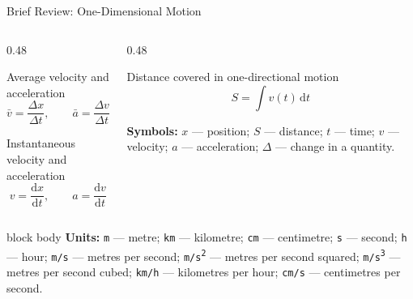 \begin{frame}{Brief Review: One-Dimensional Motion}
  \begin{columns}[T,onlytextwidth]
    \begin{column}{0.48\textwidth}
      \begin{block}{Average velocity and acceleration}
        \[
          \bar v=\frac{\Delta x}{\Delta t},
          \qquad
          \bar a=\frac{\Delta v}{\Delta t}
        \]
      \end{block}
      \begin{block}{Instantaneous velocity and acceleration}
        \[
          v=\frac{\mathrm{d}x}{\mathrm{d}t},
          \qquad
          a=\frac{\mathrm{d}v}{\mathrm{d}t}
        \]
      \end{block}
    \end{column}
    \begin{column}{0.48\textwidth}
      \begin{block}{Distance covered in one-directional motion}
        \[
          S=\int v(t)\,\mathrm{d}t
        \]
      \end{block}
      \footnotesize
      \textbf{Symbols:}
      $x$ — position; $S$ — distance; $t$ — time;
      $v$ — velocity; $a$ — acceleration;
      $\Delta$ — change in a quantity.
    \end{column}
  \end{columns}
  \vspace{0.35em}
  \begin{beamercolorbox}[rounded=true,sep=0.55em,wd=\linewidth]{block body}
    \footnotesize
    \textbf{Units:}
    \texttt{m} — metre; \texttt{km} — kilometre;
    \texttt{cm} — centimetre; \texttt{s} — second; \texttt{h} — hour;
    \texttt{m/s} — metres per second;
    \texttt{m/s\textsuperscript{2}} — metres per second squared;
    \texttt{m/s\textsuperscript{3}} — metres per second cubed;
    \texttt{km/h} — kilometres per hour;
    \texttt{cm/s} — centimetres per second.
  \end{beamercolorbox}
\end{frame}

